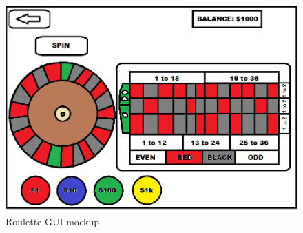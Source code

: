 \documentclass[10pt,conference,onecolumn,compsoc]{IEEEtran}
\begin{document}
\begin{figure}[h]
\caption{Roulette GUI mockup}
\includegraphics[scale=0.4]{roulette}
\centering
\end{figure}

\end{document}
